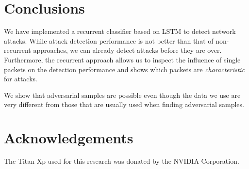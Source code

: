 \documentclass[conference]{IEEEtran}
\begin{document}
\section{Conclusions}

We have implemented a recurrent classifier based on LSTM to detect network attacks. While attack detection performance is not better than that of non-recurrent approaches, we can already detect attacks before they are over. Furthermore, the recurrent approach allows us to inspect the influence of single packets on the detection performance and shows which packets are \textit{characteristic} for attacks.

We show that adversarial samples are possible even though the data we use are very different from those that are usually used when finding adversarial samples.




\section*{Acknowledgements}
The Titan Xp used for this research was donated by the NVIDIA Corporation.
\end{document}
